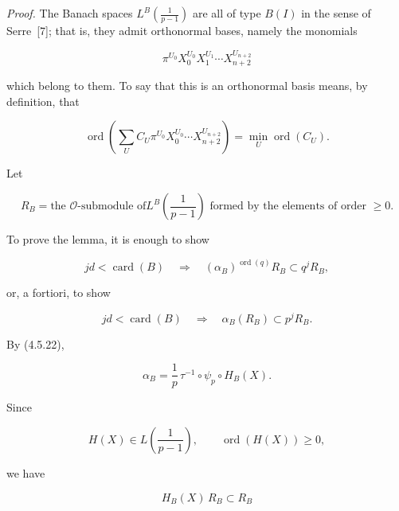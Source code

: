 \noindent\emph{Proof.}
The Banach spaces
$L^B\!\left(\frac1{p-1}\right)$ are all of type $B(I)$ in the sense of
Serre~[7]; that is, they admit orthonormal bases, namely the monomials

\begin{equation}\tag{4.6.9}
\pi^{U_0}X_0^{U_0}X_1^{U_1}\cdots X_{n+2}^{U_{n+2}}
\end{equation}

\noindent
which belong to them.  To say that this is an orthonormal basis means, by
definition, that

\begin{equation}\tag{4.6.10}
\operatorname{ord}\!\left(
\sum_U C_U\pi^{U_0}X_0^{U_0}\cdots X_{n+2}^{U_{n+2}}
\right)
=\min_U\operatorname{ord}(C_U).
\end{equation}

Let

\begin{equation}\tag{4.6.11}
R_B=\text{the $\mathcal O$-submodule of
$L^B\!\left(\frac1{p-1}\right)$ formed by the elements of order $\geq0$}.
\end{equation}

To prove the lemma, it is enough to show

\begin{equation}\tag{4.6.12}
jd<\operatorname{card}(B)
\quad\Longrightarrow\quad
(\alpha_B)^{\operatorname{ord}(q)}R_B\subset q^jR_B,
\end{equation}

or, a fortiori, to show

\begin{equation}\tag{4.6.13}
jd<\operatorname{card}(B)
\quad\Longrightarrow\quad
\alpha_B(R_B)\subset p^jR_B.
\end{equation}

By (4.5.22),

\begin{equation}\tag{4.6.14}
\alpha_B=\frac1p\,\tau^{-1}\circ\psi_p\circ H_B(X).
\end{equation}

Since

\begin{equation}\tag{4.6.15}
H(X)\in L\!\left(\frac1{p-1}\right),
\qquad \operatorname{ord}(H(X))\geq0,
\end{equation}

we have

\begin{equation}\tag{4.6.16}
H_B(X)\,R_B\subset R_B
\end{equation}

